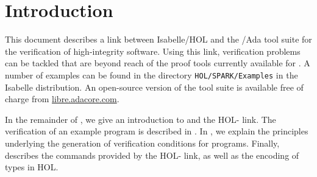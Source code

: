 \chapter{Introduction}
\label{sec:intro}

This document describes a link between Isabelle/HOL and the \SPARK{}/Ada tool
suite for the verification of high-integrity software.
Using this link, verification problems can be tackled that are beyond reach
of the proof tools currently available for \SPARK{}. A number of examples
can be found in the directory \texttt{HOL/SPARK/Examples} in the Isabelle
distribution. An open-source version of the \SPARK{} tool suite is available
free of charge from \hbox{\href{http://libre.adacore.com}{libre.adacore.com}}.

In the remainder of ,
we give an introduction to \SPARK{} and the HOL-\SPARK{} link. The verification
of an example program is described in . In
, we explain the principles underlying the generation
of verification conditions for \SPARK{} programs. Finally, 
describes the commands provided by the HOL-\SPARK{} link, as well as the encoding
of \SPARK{} types in HOL.

\section{\SPARK{}}

